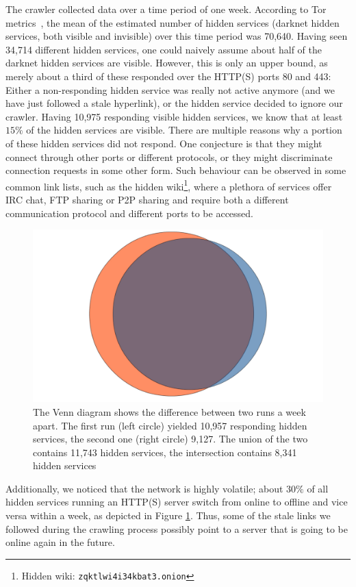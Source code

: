 \documentclass[USenglish,oneside,twocolumn]{article}
\begin{document}
The crawler collected data over a time period of one week. According to Tor metrics~\cite{TorMetricsOnion}, the mean of the estimated number of hidden services (darknet hidden services, both visible and invisible) over this time period was 70,640. Having seen 34,714 different hidden services, one could naively assume about half of the darknet hidden services are visible. However, this is only an upper bound, as merely about a third of these responded over the HTTP(S) ports 80 and 443: Either a non-responding hidden service was really not active anymore (and we have just followed a stale hyperlink), or the hidden service decided to ignore our crawler. Having 10,975 responding visible hidden services, we know that at least $15\%$ of the hidden services are visible.
There are multiple reasons why a portion of these hidden services did not respond. One conjecture is that they might connect through other ports or different protocols, or they might discriminate connection requests in some other form.
Such behaviour can be observed in some common link lists, such as the hidden wiki\footnote{Hidden wiki: \texttt{zqktlwi4i34kbat3.onion}}, where a plethora of services offer IRC chat, FTP sharing or P2P sharing and require both a different communication protocol and different ports to be accessed.

\begin{figure}
    \centering
    \includegraphics[width=0.7\linewidth]{images/DarknetVolatility.png}
    \caption{The Venn diagram shows the difference between two runs a week apart. The first run (left circle) yielded 10,957 responding hidden services, the second one (right circle) 9,127. The union of the two contains 11,743 hidden services, the intersection contains 8,341 hidden services}
    \label{fig:highVolatility}
\end{figure}

Additionally, we noticed that the network is highly volatile; about $30\%$ of all hidden services running an HTTP(S) server switch from online to offline and vice versa within a week, as depicted in Figure \ref{fig:highVolatility}.
Thus, some of the stale links we followed during the crawling process possibly point to a server that is going to be online again in the future. 
\end{document}
